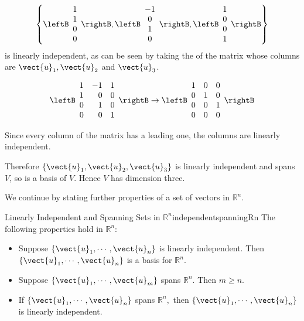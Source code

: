\begin{solution}
\[\left\{ 
\leftB\begin{array}{c} 1\\ 1\\ 0\\ 0\end{array}\rightB,
\leftB\begin{array}{c} -1\\ 0\\ 1\\ 0\end{array}\rightB,
\leftB\begin{array}{c} 1\\ 0\\ 0\\ 1\end{array}\rightB \right\}\]
is linearly independent, as can be seen by taking the
\rref\; of the matrix whose columns are
$\vect{u}_1, \vect{u}_2$ and $\vect{u}_3$.

\[ \leftB\begin{array}{rrr}
1 & -1 & 1 \\
1 & 0 & 0 \\
0 & 1 & 0 \\
0 & 0 & 1 \end{array}\rightB
\rightarrow
\leftB\begin{array}{rrr}
1 & 0 & 0 \\
0 & 1 & 0 \\
0 & 0 & 1 \\
0 & 0 & 0 \end{array}\rightB
\]

Since every column of the \rref\; matrix has a leading one,
the columns are linearly independent.

Therefore $\{ \vect{u}_1, \vect{u}_2, \vect{u}_3 \}$ is linearly
independent and spans $V$, so is a basis of $V$. Hence 
$V$ has dimension three.
\end{solution}

We continue by stating further properties of a set of vectors in  $\mathbb{R}^{n}$.

\begin{corollary}{Linearly Independent and Spanning Sets in  $\mathbb{R}^{n}$}{independentspanningRn}
The following properties hold in $\mathbb{R}^{n}$:
\begin{itemize}
\item Suppose $\left\{ \vect{u}_{1},\cdots ,\vect{u}_{n}\right\} $ is linearly independent. Then $\left\{ \vect{u}_{1},\cdots ,\vect{u}_{n}\right\} $ is a basis for $\mathbb{R}^{n}$. 
\item Suppose $\left\{ \vect{u}_{1},\cdots ,\vect{u}_{m}\right\} $ spans $\mathbb{R}^{n}.$ Then $m\geq n.$
\item If $\left\{ \vect{u}_{1},\cdots ,\vect{u}_{n}\right\} $ spans $\mathbb{R}^{n},$ then $\left\{ \vect{u}_{1},\cdots ,\vect{u}_{n}\right\} $ is
linearly independent.
\end{itemize}
\end{corollary}

